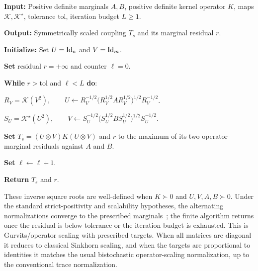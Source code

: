\begin{alg}\label{alg:quantum-gurvits-scaling}
\textbf{Input:} Positive definite marginals $A,B$, positive definite kernel operator $K$, maps $\mathcal K,\mathcal K^\star$, tolerance $\mathrm{tol}$, iteration budget $L\geq1$.

\textbf{Output:} Symmetrically scaled coupling $T_s$ and its marginal residual $r$.

\textbf{Initialize:} Set $U=\mathrm{Id}_n$ and $V=\mathrm{Id}_m$.

\textbf{Set} residual \(r=+\infty\) and counter $\ell=0$.

\textbf{While} \(r>\mathrm{tol}\) and $\ell<L$ \textbf{do}:
\begin{algblock}
\(R_V=\mathcal K(V^2), \qquad U\leftarrow R_V^{-1/2}\bigl(R_V^{1/2} A R_V^{1/2}\bigr)^{1/2}R_V^{-1/2}\).

\(S_U=\mathcal K^\star(U^2), \qquad V\leftarrow S_U^{-1/2}\bigl(S_U^{1/2} B S_U^{1/2}\bigr)^{1/2}S_U^{-1/2}\).

\textbf{Set} \(T_s=(U\otimes V)K(U\otimes V)\) and \(r\) to the maximum of its two operator-marginal residuals against $A$ and $B$.

\textbf{Set} $\ell\leftarrow \ell+1$.
\end{algblock}
\algreturnskip
\textbf{Return} \(T_s\) and $r$.
\end{alg}
These inverse square roots are well-defined when $K\succ0$ and $U,V,A,B\succ0$. Under the standard strict-positivity and scalability hypotheses, the alternating normalizations converge to the prescribed marginals~\cite{georgiou2015positive,garg2018recent}; the finite algorithm returns once the residual is below tolerance or the iteration budget is exhausted. This is Gurvits/operator scaling with prescribed targets. When all matrices are diagonal it reduces to classical Sinkhorn scaling, and when the targets are proportional to identities it matches the usual bistochastic operator-scaling normalization, up to the conventional trace normalization.


